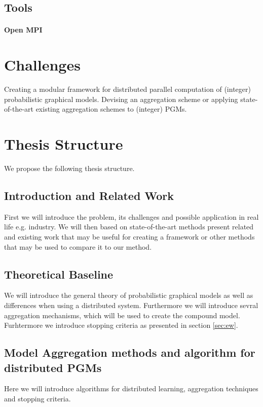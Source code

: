     \subsection{Tools}

    \paragraph{Open MPI}

    \section{Challenges}
      Creating a modular framework for distributed parallel computation of (integer) probabilistic graphical models. 
      Devising an aggregation scheme or applying state-of-the-art existing aggregation schemes to (integer) PGMs.

   
    \section{Thesis Structure}
    We propose the following thesis structure.
    
    \subsection{Introduction and Related Work}
    First we will introduce the problem, its challenges and possible application in real life e.g. industry. We will then based on state-of-the-art methods present related and existing work that may be useful for creating a framework or other methods that may be used to compare it to our method.

    \subsection{Theoretical Baseline}
    We will introduce the general theory of probabilistic graphical models as well as differences when using a distributed system. Furthermore we will introduce sevral aggregation mechanisms, which will be used to create the compound model.
    Furhtermore we introduce stopping criteria as presented in section \ref{sec:ew}.

    \subsection{Model Aggregation methods and algorithm for distributed PGMs}
    Here we will introduce algorithms for distributed learning, aggregation techniques and stopping criteria.

